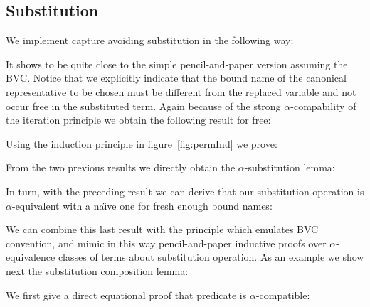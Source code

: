 \documentclass{entcs}
\newcommand{\alp}{\ensuremath{\alpha}}
\begin{document}
\subsection{Substitution}
\label{subst}

We implement capture avoiding substitution in the following way:

 \hspace{5px}

It shows to be quite close to the simple pencil-and-paper version assuming the BVC. Notice that we explicitly indicate that the bound name of the canonical representative to be chosen must be different from the replaced variable and not occur free in the substituted term.
Again because of the strong \alp-compability of the iteration principle we obtain the following result for free:

 \hspace{5px}

Using the induction principle in figure~\ref{fig:permInd} we prove:

 \hspace{5px}

From the two previous results we directly obtain the \alp-substitution lemma:

 \hspace{5px}

In turn, with the preceding result we can derive that our substitution operation is \alp-equivalent with a na\"\i ve one for fresh enough bound names:

 \hspace{5px}

We can combine this last result with the  principle which emulates BVC convention, and mimic in this way pencil-and-paper inductive proofs over \alp-equivalence classes of terms about substitution operation. As an example we show next the substitution composition lemma:

 \hspace{5px}

\noindent We first give a direct equational proof that  predicate is \alp-compatible:
\end{document}
